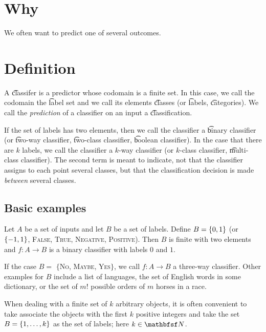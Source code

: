 

\section*{Why}

We often want to predict one of several outcomes.

\section*{Definition}

A \t{classifer} is a predictor whose codomain is a finite set.
In this case, we call the codomain the \t{label set} and we call its elements \t{classes} (or \t{labels}, \t{categories}).
We call the \textit{prediction} of a classifier on an input a \t{classification}.

If the set of labels has two elements, then we call the classifier a \t{binary classifier} (or \t{two-way classifier}, \t{two-class classifier}, \t{boolean classifier}).
In the case that there are $k$ labels, we call the classifier a \t{$k$-way classifier} (or \t{$k$-class classifier}, \t{multi-class classifier}).
The second term is meant to indicate, not that the classifier assigns to each point several classes, but that the classification decision is made \textit{between} several classes.

\subsection*{Basic examples}

Let $A$ be a set of inputs and let $B$ be a set of labels.
Define $B = \{0, 1\}$ (or $\{-1,1\}$, {\textsc{False}, \textsc{True}}, {\textsc{Negative}, \textsc{Positive}}).
Then $B$ is finite with two elements and $f: A \to B$ is a binary classifier with labels $0$ and $1$.

If the case $B = $ $\{$\textsc{No}, \textsc{Maybe}, \textsc{Yes}$\}$, we call $f: A \to B$ a three-way classifier.
Other examples for $B$ include a list of languages, the set of English words in some dictionary, or the set of $m!$ possible orders of $m$ horses in a race.

When dealing with a finite set of $k$ arbitrary objects, it is often convenient to take associate the objects with the first $k$ positive integers and take the set $B = \{1, \dots , k\}$ as the set of labels; here $k \in \N  $.

